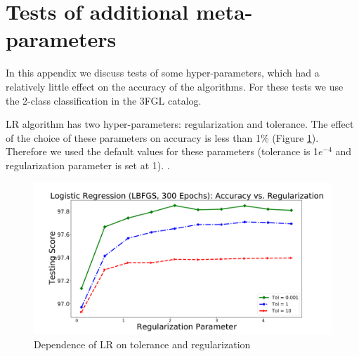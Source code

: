 \section{Tests of additional meta-parameters}

In this appendix we discuss tests of some hyper-parameters, which had a relatively little effect on the 
accuracy of the algorithms. For these tests we use the 2-class classification in the 3FGL catalog.

LR algorithm has two hyper-parameters: regularization and tolerance. 
The effect of the choice of these parameters on accuracy is less than 1\% (Figure \ref{fig:LR_tol_reg}). 
Therefore we used the default values for these parameters (tolerance is 1$e^{-4}$ and regularization parameter is set at 1).
. 
\begin{figure}[h]
\includegraphics[width=\twopicsp\textwidth]{plots/lr_train_reg.pdf}
\caption{Dependence of LR on tolerance and regularization}
\label{fig:LR_tol_reg}
\end{figure}

